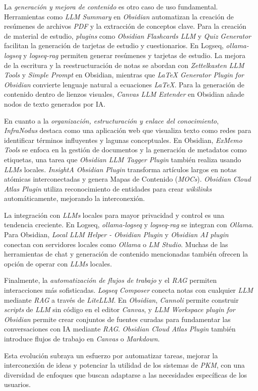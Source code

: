 La \textit{generación y mejora de contenido} es otro caso de uso fundamental. Herramientas como \textit{LLM Summary} en \textit{Obsidian} automatizan la creación de resúmenes de archivos \textit{PDF} y la extracción de conceptos clave. Para la creación de material de estudio, \textit{plugins} como \textit{Obsidian Flashcards LLM} y \textit{Quiz Generator} facilitan la generación de tarjetas de estudio y cuestionarios. En Logseq, \textit{ollama-logseq} y \textit{logseq-rag} permiten generar resúmenes y tarjetas de estudio. La mejora de la escritura y la reestructuración de notas se abordan con \textit{Zettelkasten LLM Tools} y \textit{Simple Prompt} en Obsidian, mientras que \textit{LaTeX Generator Plugin for Obsidian} convierte lenguaje natural a ecuaciones \textit{LaTeX}. Para la generación de contenido dentro de lienzos visuales, \textit{Canvas LLM Extender} en Obsidian añade nodos de texto generados por IA.

En cuanto a la \textit{organización, estructuración y enlace del conocimiento}, \textit{InfraNodus} destaca como una aplicación web que visualiza texto como redes para identificar términos influyentes y lagunas conceptuales. En Obsidian, \textit{ExMemo Tools} se enfoca en la gestión de documentos y la generación de metadatos como etiquetas, una tarea que \textit{Obsidian LLM Tagger Plugin} también realiza usando \textit{LLMs} locales. \textit{InsightA Obsidian Plugin} transforma artículos largos en notas atómicas interconectadas y genera Mapas de Contenido (\textit{MOCs}). \textit{Obsidian Cloud Atlas Plugin} utiliza reconocimiento de entidades para crear \textit{wikilinks} automáticamente, mejorando la interconexión.

La integración con \textit{LLMs} locales para mayor privacidad y control es una tendencia creciente. En Logseq, \textit{ollama-logseq} y \textit{logseq-rag} se integran con \textit{Ollama}. Para Obsidian, \textit{Local LLM Helper - Obsidian Plugin} y \textit{Obsidian AI plugin} conectan con servidores locales como \textit{Ollama} o \textit{LM Studio}. Muchas de las herramientas de chat y generación de contenido mencionadas también ofrecen la opción de operar con \textit{LLMs} locales.

Finalmente, la \textit{automatización de flujos de trabajo} y el \textit{RAG} permiten interacciones más sofisticadas. \textit{Logseq Composer} conecta notas con cualquier \textit{LLM} mediante \textit{RAG} a través de \textit{LiteLLM}. En \textit{Obsidian}, \textit{Cannoli} permite construir \textit{scripts} de \textit{LLM} sin código en el editor \textit{Canvas}, y \textit{LLM Workspace plugin for Obsidian} permite crear conjuntos de fuentes curadas para fundamentar las conversaciones con IA mediante \textit{RAG}. \textit{Obsidian Cloud Atlas Plugin} también introduce flujos de trabajo en \textit{Canvas} o \textit{Markdown}.

Esta evolución subraya un esfuerzo por automatizar tareas, mejorar la interconexión de ideas y potenciar la utilidad de los sistemas de \textit{PKM}, con una diversidad de enfoques que buscan adaptarse a las necesidades específicas de los usuarios.